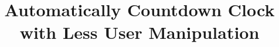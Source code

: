 \documentclass{sig-alternate-ipsn13}
\begin{document}
\title{Automatically Countdown Clock with Less User Manipulation}

%
%
%
%
%
\end{document}
